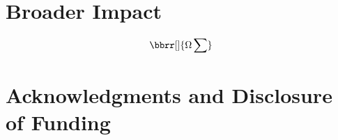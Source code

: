 \documentclass{article}
\theoremstyle{plain}
\theoremstyle{definition}
\theoremstyle{remark}
\newcommand{\todo}[1]{{\color{red}\ \!\Large\smash{\textbf{[}}{\normalsize\textsc{todo:} #1}\ \!\smash{\textbf{]}}}}
\numberwithin{equation}{section}
\begin{document}
	
	
	
	\section*{Broader Impact}
\[\bbrr[]{\Omega\sum}\]
	\section*{Acknowledgments and Disclosure of Funding}
	{
		\small
		
		
	}
	\onecolumn
	\appendix
	
\end{document}
